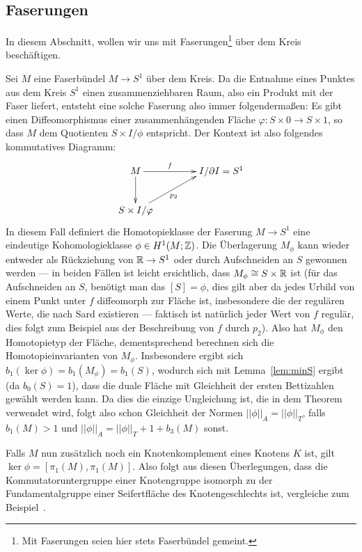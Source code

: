    \subsection{Faserungen}
    \label{sec:fibrations}

    In diesem Abschnitt, wollen wir uns mit Faserungen\footnote{Mit Faserungen seien hier stets Faserbündel gemeint.} über dem Kreis beschäftigen.
        
    \begin{bsp}
    	Sei $M$ eine Faserbündel $M\to S^1$ über dem Kreis. Da die Entnahme eines Punktes aus dem Kreis $S^1$ einen zusammenziehbaren Raum, also ein Produkt mit der Faser liefert, entsteht eine solche Faserung also immer folgendermaßen: Es gibt einen Diffeomorphismus einer zusammenhängenden Fläche $\varphi: S \times 0 \to S\times 1$, so dass $M$ dem Quotienten $S\times I/\phi$ entspricht. Der Kontext ist also folgendes kommutatives Diagramm:
    	\[
    		\begin{xy}
    			\xymatrix{M \ar[r]^f \ar[d] &**[r] I/\partial I = S^1 \\
    					S\times I /\varphi \ar[ru]_{p_2}}
    		\end{xy}
    	\]
    	In diesem Fall definiert die Homotopieklasse der Faserung $M \to S^1$ eine eindeutige Kohomologieklasse $\phi\in H^1(M;\mathbb{Z})$. Die Überlagerung $M_\phi$ kann wieder entweder als Rückziehung von $\mathbb{R} \to S^1$ oder durch Aufschneiden an $S$ gewonnen werden --- in beiden Fällen ist leicht ersichtlich, dass $M_\phi \cong S \times \mathbb{R}$ ist (für das Aufschneiden an $S$, benötigt man das $[S]=\phi$, dies gilt aber da jedes Urbild von einem Punkt unter $f$ diffeomorph zur Fläche ist, insbesondere die der regulären Werte, die nach Sard existieren --- faktisch ist natürlich jeder Wert von $f$ regulär, dies folgt zum Beispiel aus der Beschreibung von $f$ durch $p_2$). Also hat $M_\phi$ den Homotopietyp der Fläche, dementsprechend berechnen sich die Homotopieinvarianten von $M_\phi$. Insbesondere ergibt sich $b_1(\ker\phi) =b_1(M_\phi)= b_1(S)$, wodurch sich mit Lemma~\ref{lem:minS} ergibt (da $b_0(S)=1$), dass die duale Fläche mit Gleichheit der ersten Bettizahlen gewählt werden kann. Da dies die einzige Ungleichung ist, die in dem Theorem verwendet wird, folgt also schon Gleichheit der Normen $||\phi||_A = ||\phi||_T$, falls $b_1(M)>1$ und $||\phi||_A = ||\phi||_T+1+b_3(M)$ sonst.

        Falls $M$ nun zusätzlich noch ein Knotenkomplement eines Knotens $K$ ist, gilt $\ker\phi = [\pi_1(M),\pi_1(M)]$. Also folgt aus diesen Überlegungen, dass die Kommutatoruntergruppe einer Knotengruppe isomorph zu der Fundamentalgruppe einer Seifertfläche des Knotengeschlechts ist, vergleiche zum Beispiel~\cite[Theorem 4.6]{Burde.2003}.


\end{bsp}
